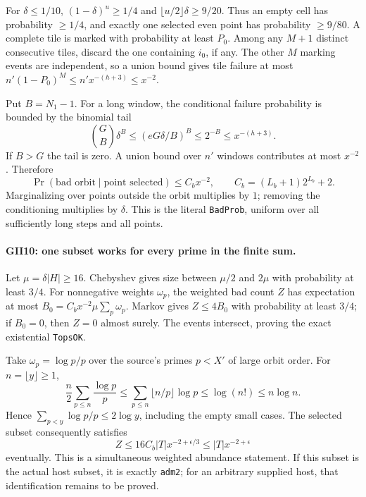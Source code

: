 For $\delta\le1/10$, $(1-\delta)^u\ge1/4$ and
$\lfloor u/2\rfloor\delta\ge9/20$. Thus an empty cell has probability
$\ge1/4$, and exactly one selected even point has probability $\ge9/80$.
A complete tile is marked with probability at least $P_0$.
Among any $M+1$ distinct consecutive tiles, discard the one containing
$i_0$, if any. The other $M$ marking events are independent, so a union
bound gives tile failure at most
$n'(1-P_0)^M\le n'x^{-(h+3)}\le x^{-2}$.

Put $B=N_1-1$. For a long window, the conditional failure probability
is bounded by the binomial tail
\[
 \binom GB\delta^B\le(eG\delta/B)^B\le2^{-B}\le x^{-(h+3)}.
\]
If $B>G$ the tail is zero. A union bound over $n'$ windows contributes
at most $x^{-2}$. Therefore
\[
 \Pr(\text{bad orbit}\mid\text{point selected})\le C_bx^{-2},
 \qquad C_b=(L_b+1)2^{L_b}+2.\tag{GII.12}
\]
Marginalizing over points outside the orbit multiplies by $1$; removing
the conditioning multiplies by $\delta$. This is the literal
\texttt{BadProb}, uniform over all sufficiently long steps and all points.

\paragraph{GII10: one subset works for every prime in the finite sum.}
Let $\mu=\delta|H|\ge16$. Chebyshev gives size between $\mu/2$ and
$2\mu$ with probability at least $3/4$. For nonnegative weights
$\omega_p$, the weighted bad count $Z$ has expectation at most
$B_0=C_bx^{-2}\mu\sum_p\omega_p$. Markov gives $Z\le4B_0$ with
probability at least $3/4$; if $B_0=0$, then $Z=0$ almost surely.
The events intersect, proving the exact existential \texttt{TopsOK}.

Take $\omega_p=\log p/p$ over the source's primes $p<X'$ of large
orbit order. For $n=\lfloor y\rfloor\ge1$,
\[
 \frac n2\sum_{p\le n}\frac{\log p}{p}
 \le\sum_{p\le n}\lfloor n/p\rfloor\log p
 \le\log(n!)\le n\log n.
\]
Hence $\sum_{p<y}\log p/p\le2\log y$, including the empty small cases.
The selected subset consequently satisfies
\[
 Z\le16C_b|T|x^{-2+\epsilon/3}
   \le |T|x^{-2+\epsilon}\tag{GII.13}
\]
eventually. This is a simultaneous weighted abundance statement. If this
subset is the actual host subset, it is exactly \texttt{adm2}; for an
arbitrary supplied host, that identification remains to be proved.
